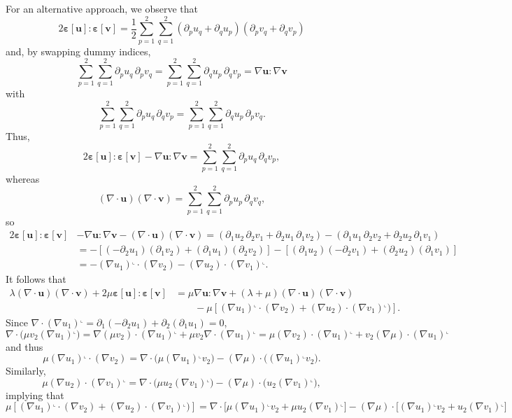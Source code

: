 \documentclass[a4paper,12pt]{article}
\newcommand{\bs}[1]{\boldsymbol{#1}}
\newcommand{\rot}{^\llcorner}
\begin{document}
For an alternative approach, we observe that
\[
2\bs{\varepsilon}[\bs{u}]:\bs{\varepsilon}[\bs{v}]
=\frac12\sum_{p=1}^2\sum_{q=1}^2(\partial_pu_q+\partial_qu_p)
(\partial_pv_q+\partial_qv_p)
\]
and, by swapping dummy indices,
\[
\sum_{p=1}^2\sum_{q=1}^2\partial_pu_q\,\partial_pv_q
    =\sum_{p=1}^2\sum_{q=1}^2\partial_qu_p\,\partial_qv_p
    =\nabla\bs{u}:\nabla\bs{v}
\]
with
\[
\sum_{p=1}^2\sum_{q=1}^2\partial_pu_q\,\partial_qv_p
    =\sum_{p=1}^2\sum_{q=1}^2\partial_qu_p\,\partial_pv_q.
\]
Thus,
\[
2\bs{\varepsilon}[\bs{u}]:\bs{\varepsilon}[\bs{v}]-\nabla\bs{u}:\nabla\bs{v}
    =\sum_{p=1}^2\sum_{q=1}^2\partial_pu_q\,\partial_qv_p,
\]
whereas
\[
(\nabla\cdot\bs{u})(\nabla\cdot\bs{v})=\sum_{p=1}^2\sum_{q=1}^2
    \partial_pu_p\,\partial_qv_q,
\]
so
\begin{align*}
2\bs{\varepsilon}[\bs{u}]:\bs{\varepsilon}[\bs{v}]&-\nabla\bs{u}:\nabla\bs{v}
    -(\nabla\cdot\bs{u})(\nabla\cdot\bs{v})
    =(\partial_1u_2\,\partial_2v_1+\partial_2u_1\,\partial_1v_2)
    -(\partial_1u_1\,\partial_2v_2+\partial_2u_2\,\partial_1v_1)\\
    &=-[(-\partial_2u_1)(\partial_1v_2)+(\partial_1u_1)(\partial_2v_2)]
    -[(\partial_1u_2)(-\partial_2v_1)+(\partial_2u_2)(\partial_1v_1)]\\
    &=-(\nabla u_1)\rot\cdot(\nabla v_2)
        -(\nabla u_2)\cdot(\nabla v_1)\rot.
\end{align*}
It follows that
\begin{align*}
\lambda(\nabla\cdot\bs{u})(\nabla\cdot\bs{v})
+2\mu\bs{\varepsilon}[\bs{u}]:\bs{\varepsilon}[\bs{v}]
    &=\mu\nabla\bs{u}:\nabla\bs{v}
    +(\lambda+\mu)(\nabla\cdot\bs{u})(\nabla\cdot\bs{v})\\
    &\qquad{}-\mu[(\nabla u_1)\rot\cdot(\nabla v_2)
        +(\nabla u_2)\cdot(\nabla v_1)\rot)].
\end{align*}
Since $\nabla\cdot(\nabla u_1)\rot
=\partial_1(-\partial_2u_1)+\partial_2(\partial_1u_1)=0$,
\[
\nabla\cdot\bigl(\mu v_2(\nabla u_1)\rot\bigr)
    =\nabla(\mu v_2)\cdot(\nabla u_1)\rot+\mu v_2\nabla\cdot(\nabla u_1)\rot
    =\mu(\nabla v_2)\cdot(\nabla u_1)\rot+v_2(\nabla\mu)\cdot(\nabla u_1)\rot
\]
and thus
\[
\mu(\nabla u_1)\rot\cdot(\nabla v_2)
    =\nabla\cdot\bigl(\mu(\nabla u_1)\rot v_2\bigr)
    -(\nabla\mu)\cdot((\nabla u_1)\rot v_2\bigr).
\]
Similarly,
\[
\mu(\nabla u_2)\cdot(\nabla v_1)\rot
    =\nabla\cdot\bigl(\mu u_2(\nabla v_1)\rot\bigr)
    -(\nabla\mu)\cdot\bigl(u_2(\nabla v_1)\rot\bigr),
\]
implying that
\[
\mu[(\nabla u_1)\rot\cdot(\nabla v_2)+(\nabla u_2)\cdot(\nabla v_1)\rot)]
=\nabla\cdot\bigl[\mu(\nabla u_1)\rot v_2+\mu u_2(\nabla v_1)\rot\bigr]
-(\nabla\mu)\cdot\bigl[(\nabla u_1)\rot v_2+u_2(\nabla v_1)\rot]
\]
\end{document}
